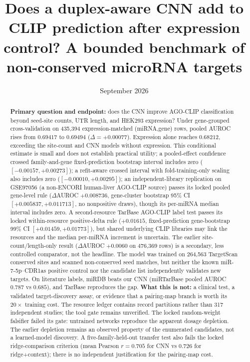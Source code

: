 \documentclass[11pt]{article}
\title{Does a duplex-aware CNN add to CLIP prediction after expression control? A bounded benchmark of non-conserved microRNA targets}
\date{September 2026}
\begin{document}
\maketitle
\begin{abstract}
\textbf{Primary question and endpoint:} does the CNN improve AGO-CLIP
classification beyond seed-site counts, UTR length, and HEK293 expression?
Under gene-grouped cross-validation on 435{,}394 expression-matched
(miRNA,gene) rows, pooled AUROC rises from $0.69417$ to $0.69494$
($\Delta=+0.00077$). Expression alone reaches $0.68212$, exceeding the
site-count and CNN models without expression. This conditional estimate is
small and does not establish practical utility; a pooled-effect confidence
crossed family-and-gene fixed-prediction bootstrap interval includes zero
($[-0.00157,+0.00273]$); a refit-aware crossed interval with
fold-training-only scaling also includes zero ($[-0.00010,+0.00295]$);
an independent-library replication on GSE97056 (a non-ENCORI human-liver AGO-CLIP source) passes its locked pooled gene-level rule ($\Delta$AUROC $+0.008736$, gene-cluster bootstrap 95\% CI $[+0.005837,\allowbreak +0.011713]$, no nonpositive draws), though its per-miRNA median interval includes zero. A second-resource TarBase AGO-CLIP label
test passes its locked within-resource positive-delta rule ($+0.01615$,
fixed-prediction gene-bootstrap 99\% CI $[+0.01459,\allowbreak +0.01773]$), but shared
underlying CLIP libraries may link the resources and the median per-miRNA
increment is uncertain. The earlier
site-count/length-only result ($\Delta$AUROC $+0.0060$ on 476{,}369 rows)
is a secondary, less controlled comparator, not the headline. The model was
trained on 264{,}563 TargetScan conserved sites and scanned non-conserved seed
matches, but neither the known miR-7-5p--CDR1as positive control nor the
candidate list independently validates new targets. On literature labels,
miRDB beats our CNN (miRTarBase pooled AUROC $0.787$ vs $0.685$), and
TarBase reproduces the gap. \textbf{What this is not:} a clinical test, a
validated target-discovery assay, or evidence that a pairing-map branch is
worth its $20\times$ training cost. The resource ledger contains record
partitions rather than 317 independent studies; the tool gate remains
unverified. The locked random-weight falsifier failed its gate: untrained networks
reproduce the apparent dosage depletion. The earlier depletion remains an
observed property of the enumerated candidates, not a learned-model discovery.
A five-family-held-out transfer test also fails the locked ridge-comparison
criterion (mean Pearson $r=0.705$ for CNN vs $0.726$ for ridge+context);
there is no independent justification for the pairing-map cost.
\end{abstract}
\tableofcontents\newpage
\end{document}
